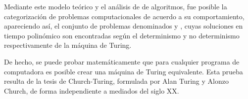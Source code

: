 \documentclass[12pt,a4paper,spanish]{book}
\begin{document}
\begin{itemize}
Mediante este modelo te\'orico y el an\'alisis de  de algoritmos, fue posible la categorizaci\'on de problemas computacionales de acuerdo a su comportamiento, apareciendo as\'i, el conjunto de problemas denominados  y , cuyas soluciones en tiempo polin\'omico son encontradas seg\'un el determinismo y no determinismo respectivamente de la m\'aquina de Turing.

De hecho, se puede probar matem\'aticamente que para cualquier programa de computadora es posible crear una m\'aquina de Turing equivalente. Esta prueba resulta de la tesis de Church-Turing, formulada por Alan Turing y Alonzo Church, de forma independiente a mediados del siglo XX.


\end{itemize}
\end{document}
